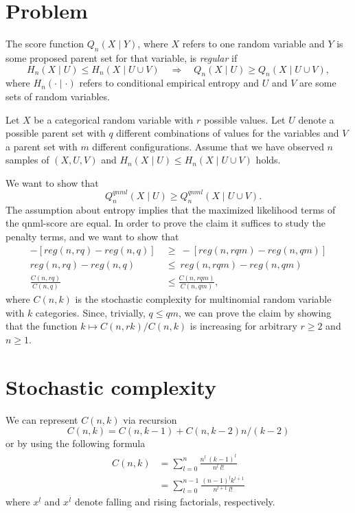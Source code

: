 \documentclass[12pt]{article}
\begin{document}
\section{Problem}

The score function $Q_n(X \mid Y)$, where $X$ refers to one random variable and $Y$ is some proposed parent set for that variable, is \textit{regular} if 
$$H_n(X \mid U) \leq H_n(X \mid U \cup V) \quad \Rightarrow \quad  Q_n(X\mid U) \geq Q_n(X \mid U \cup V), $$ 
where $H_n(\cdot\mid \cdot)$ refers to conditional empirical entropy and $U$ and $V$ are some sets of random variables.

Let $X$ be a categorical random variable with $r$ possible values. Let $U$ denote a possible parent set with $q$ different combinations of values for the variables and $V$ a parent set with $m$ different configurations. Assume that we have observed $n$ samples of $(X,U,V)$ and $H_n(X \mid U) \leq H_n(X \mid U \cup V)$ holds.

We want to show that
$$
\quad  Q^{qnml}_n(X\mid U) \geq Q^{qnml}_n(X \mid U \cup V).
$$
The assumption about entropy implies that the maximized likelihood terms of the qnml-score are equal. In order to prove the claim it suffices to study the penalty terms, and we want to show that
\begin{align*}
-[reg(n,rq) - reg(n,q) ] \ &\geq \  -[reg(n,rqm) - reg(n,qm) ] \\
reg(n,rq) - reg(n,q) \ &\leq \  reg(n,rqm) - reg(n,qm) \\
 \frac{C(n,rq)}{C(n,q)} \ &\leq \frac{C(n,rqm)}{C(n,qm)},
\end{align*} where $C(n,k)$ is the stochastic complexity for multinomial random variable with $k$ categories. Since, trivially, $q \leq qm$, we can prove the claim by showing that the function $k \mapsto C(n,rk)/C(n,k)$ is increasing for arbitrary $r \geq 2$ and $n \geq 1$. 

\section{Stochastic complexity}
We can represent $C(n,k)$ via recursion $$C(n,k) = C(n,k-1) + C(n,k-2)n/(k-2)$$
or by using the following formula
\begin{align*}
C(n,k) &= \sum_{l=0}^n\frac{n^{\underline{l} } \ (k-1)^{\overline{l}}}{n^l \ l!} \\
&= \sum_{l=0}^{n-1}\frac{(n-1)^{\underline{l}}k^{\overline{l + 1}}}{n^{l+1} \ l!} 
\end{align*}where $x^{\underline{l}}$ and $x^{\overline{l}}$ denote falling and rising factorials, respectively.
\end{document}
